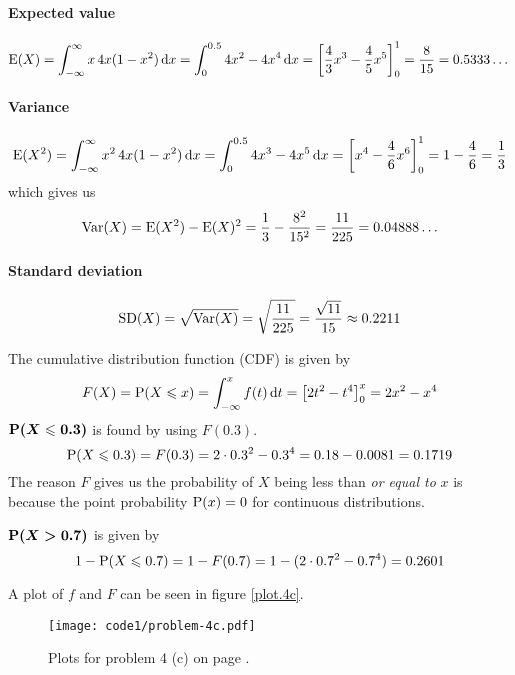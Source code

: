\documentclass[a4paper,english,12pt]{article}
\begin{document}
\paragraph{Expected value}
\[
  \mathrm{E}(X)
    = \int_{-\infty}^{\infty} x\,4x(1-x^2)\, \mathrm{d} x
    = \int_{0}^{0.5} 4x^2 - 4x^4 \, \mathrm{d} x
    = \left[ \frac{4}{3}x^3 - \frac{4}{5}x^5 \right]_{0}^{1}
    = \frac{8}{15} = 0.5333\dots
\]
\paragraph{Variance}
\begin{align*}
  \mathrm{E}(X^2)
    = \int_{-\infty}^{\infty} x^2\,4x(1-x^2)\, \mathrm{d} x
    = \int_{0}^{0.5} 4x^3 - 4x^5 \, \mathrm{d} x
    = \left[ x^4 - \frac{4}{6}x^6 \right]_{0}^{1}
    = 1 - \frac{4}{6} = \frac{1}{3}
\end{align*}
which gives us
\begin{align*}
  \mathrm{Var}(X) = \mathrm{E}(X^2) - \mathrm{E}(X)^2 = \frac{1}{3} - \frac{8^2}{15^2} =
    \frac{11}{225} = 0.04888\dots
\end{align*}
\paragraph{Standard deviation}\[
  \mathrm{SD}(X) = \sqrt{\mathrm{Var}(X)} = \sqrt{\frac{11}{225}} = \frac{\sqrt{11}}{15}
  \approx 0.2211
\]

The cumulative distribution function (CDF) is given by
\[
  F(X) = \mathrm{P}(X \leqslant x) = \int_{-\infty}^{x} f(t)\, \mathrm{d}t
    = \left[ 2t^2 - t^4 \right]_{0}^{x} = 2x^2 - x^4
\]
$\boldsymbol{\mathrm{P}(X \leqslant 0.3)}$ is found by using $F(0.3)$.
\[
  \mathrm{P}(X \leqslant 0.3) = F(0.3) = 2\cdot0.3^2 - 0.3^4 = 0.18 - 0.0081 = 0.1719
\]
The reason $F$ gives us the probability of $X$ being less than \textit{or equal
to} $x$ is because the point probability $\mathrm{P}(x) = 0$ for continuous
distributions.

$\boldsymbol{\mathrm{P}(X > 0.7)}$ is given by
\[
  1 - \mathrm{P}(X \leqslant 0.7) = 1 - F(0.7)
    = 1 - (2\cdot 0.7^2 - 0.7^4) = 0.2601
\]

A plot of $f$ and $F$ can be seen in figure \vref{plot.4c}.
  \begin{figure}[H]
  \texttt{[image: code1/problem-4c.pdf]}
  \caption{Plots for problem 4 (c) on page \pageref{problem.4 (c)}.}
  \label{plot.4c}
\end{figure}
\end{document}
